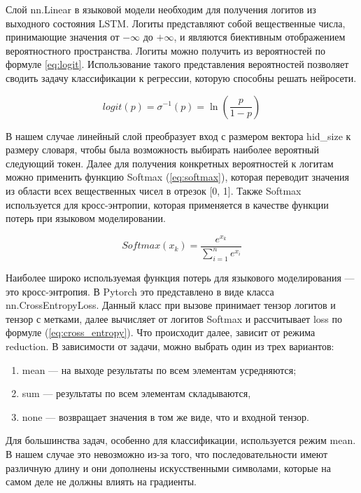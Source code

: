 Слой nn.Linear в языковой модели необходим для получения логитов из выходного состояния LSTM. Логиты представляют собой вещественные числа, принимающие значения от $-\infty$ до $+\infty$, и являются биективным отображением вероятностного пространства. Логиты можно получить из вероятностей по формуле \ref{eq:logit}. Использование такого представления вероятностей позволяет сводить задачу классификации к регрессии, которую способны решать нейросети.

\begin{equation}
	logit(p) = \sigma^{-1}(p) = \ln{\left(\frac{p}{1 - p}\right)}
	\label{eq:logit}
\end{equation}

В нашем случае линейный слой преобразует вход с размером вектора hid\_size к размеру словаря, чтобы была возможность выбирать наиболее вероятный следующий токен. Далее для получения конкретных вероятностей к логитам можно применить функцию Softmax (\ref{eq:softmax}), которая переводит значения из области всех вещественных чисел в отрезок [0, 1]. Также Softmax используется для кросс-энтропии, которая применяется в качестве функции потерь при языковом моделировании.

\begin{equation}
	Softmax(x_k) = \frac{e^{x_k}}{\sum_{i=1}^{n}{e^{x_i}}}
	\label{eq:softmax}
\end{equation}

Наиболее широко используемая функция потерь для языкового моделирования --- это кросс-энтропия. В Pytorch это представлено в виде класса nn.CrossEntropyLoss. Данный класс при вызове принимает тензор логитов и тензор с метками, далее вычисляет от логитов Softmax и рассчитывает loss по формуле (\ref{eq:cross_entropy}). Что происходит далее, зависит от режима reduction. В зависимости от задачи, можно выбрать один из трех вариантов:

\begin{enumerate}
	\item mean --- на выходе результаты по всем элементам усредняются;
	\item sum --- результаты по всем элементам складываются,
	\item none --- возвращает значения в том же виде, что и входной тензор.
\end{enumerate}

Для большинства задач, особенно для классификации, используется режим mean. В нашем случае это невозможно из-за того, что последовательности имеют различную длину и они дополнены искусственными символами, которые на самом деле не должны влиять на градиенты.


